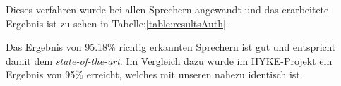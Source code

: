 Dieses verfahren wurde bei allen Sprechern angewandt und das erarbeitete Ergebnis ist zu sehen in Tabelle:\ref{table:resultsAuth}.

\begin{table}[h]
\label{table:resultsAuth}
\end{table}

Das Ergebnis von 95.18\% richtig erkannten Sprechern ist gut und entspricht damit dem \textit{state-of-the-art}.\cite{beigi} Im Vergleich dazu wurde im HYKE-Projekt ein Ergebnis von 95\% erreicht, welches mit unseren nahezu identisch ist.\cite{hyke}

